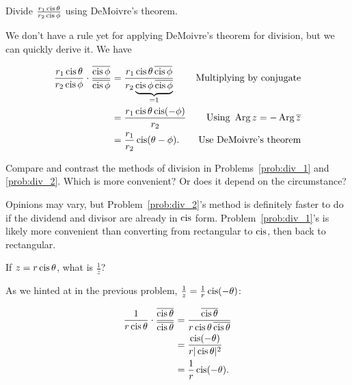 \documentclass[../key.tex]{subfiles}
\begin{document}
\begin{outer_problem}
\item Divide $\frac{r_1\operatorname{cis} \theta}{r_2\operatorname{cis} \phi}$ using DeMoivre's theorem.~\label{prob:div_2}
\end{outer_problem}

We don't have a rule yet for applying DeMoivre's theorem for division, but we can quickly derive it. We have

\begin{align*}
\frac{r_1\operatorname{cis} \theta}{r_2\operatorname{cis} \phi} \cdot \frac{\overline{\operatorname{cis} \phi}}{\overline{\operatorname{cis} \phi}} &= \frac{r_1\operatorname{cis} \theta \, \overline{\operatorname{cis} \phi}}{r_2\underbrace{\operatorname{cis} \phi \, \overline{\operatorname{cis} \phi}}_{=1}} & \text{Multiplying by conjugate} \\
&= \frac{r_1\operatorname{cis} \theta \operatorname{cis} (-\phi)}{r_2} & \text{Using }\operatorname{Arg} z = -\operatorname{Arg} \overline{z} \\
&= \frac{r_1}{r_2}\operatorname{cis} (\theta-\phi). & \text{Use DeMoivre's theorem} \\
\end{align*}

\begin{outer_problem}
\item Compare and contrast the methods of division in Problems~\ref{prob:div_1} and \ref{prob:div_2}. Which is more convenient? Or does it depend on the circumstance?
\end{outer_problem}

Opinions may vary, but Problem~\ref{prob:div_2}'s method is definitely faster to do if the dividend and divisor are already in $\operatorname{cis}$ form. Problem~\ref{prob:div_1}'s is likely more convenient than converting from rectangular to $\operatorname{cis}$, then back to rectangular.

\begin{outer_problem}
\item
\end{outer_problem}

\begin{inner_problem}[start=1]
\item If $z = r\operatorname{cis} \theta$, what is $\frac{1}{z}$?
\end{inner_problem}

As we hinted at in the previous problem, $\frac{1}{z}=\frac{1}{r}\operatorname{cis} (-\theta)$:

\begin{align*}
\frac{1}{r\operatorname{cis}\theta} \cdot \frac{\overline{\operatorname{cis}\theta}}{\overline{\operatorname{cis}\theta}} &= \frac{\overline{\operatorname{cis}\theta}}{r\operatorname{cis}\theta\,\overline{\operatorname{cis}\theta}} \\
&= \frac{\operatorname{cis}(-\theta)}{r|\operatorname{cis}\theta|^2} \\
&= \frac{1}{r} \operatorname{cis}(-\theta).
\end{align*}
\end{document}
